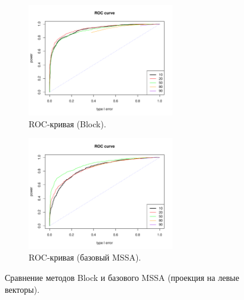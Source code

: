 \documentclass[specialist,
substylefile = spbu_report.rtx,
subf,href,colorlinks=true, 12pt]{disser}
\theoremstyle{definition}
\begin{document}
\begin{figure}[h!]
	\bigskip
	\begin{subfigure}[t]{0.45\textwidth}
		\centering
		\includegraphics[width=0.7\textwidth]{img/roc_block_ev.pdf}
		\caption{ROC-кривая (Block).}
	\end{subfigure}\hspace{\fill}
	\begin{subfigure}[t]{0.45\textwidth}
		\centering
		\includegraphics[width=0.7\textwidth]{img/roc_mssa_ev.pdf}
		\caption{ROC-кривая (базовый MSSA).}
	\end{subfigure}
	\caption{Сравнение методов Block и базового MSSA (проекция на левые векторы).}
	\label{fig:block_ev}
\end{figure}
\end{document}
